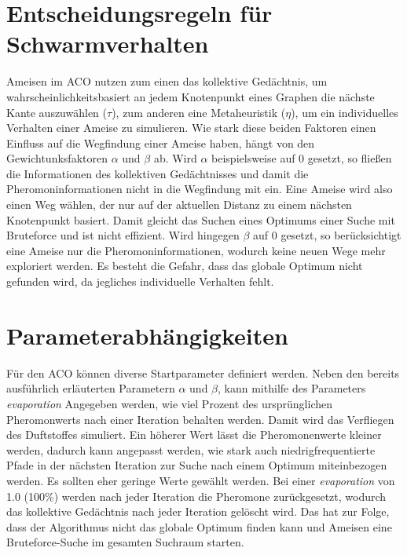 \section{Entscheidungsregeln für Schwarmverhalten}

Ameisen im ACO nutzen zum einen das kollektive Gedächtnis, um
wahrscheinlichkeitsbasiert an jedem Knotenpunkt eines Graphen die nächste
Kante auszuwählen ($\tau$), zum anderen eine Metaheuristik ($\eta$), um ein
individuelles Verhalten einer Ameise zu simulieren. Wie stark diese beiden
Faktoren einen Einfluss auf die Wegfindung einer Ameise haben, hängt von
den Gewichtunksfaktoren $\alpha$ und $\beta$ ab. Wird $\alpha$ beispielsweise
auf 0 gesetzt, so fließen die Informationen des kollektiven Gedächtnisses und
damit die Pheromoninformationen nicht in die Wegfindung mit ein. Eine Ameise
wird also einen Weg wählen, der nur auf der aktuellen Distanz zu einem nächsten
Knotenpunkt basiert. Damit gleicht das Suchen eines Optimums einer Suche mit
Bruteforce und ist nicht effizient. Wird hingegen $\beta$ auf 0 gesetzt, so
berücksichtigt eine Ameise nur die Pheromoninformationen, wodurch keine neuen
Wege mehr exploriert werden. Es besteht die Gefahr, dass das globale Optimum
nicht gefunden wird, da jegliches individuelle Verhalten fehlt.

\section{Parameterabhängigkeiten}

Für den ACO können diverse Startparameter definiert werden. Neben den
bereits ausführlich erläuterten Parametern $\alpha$ und $\beta$, kann
mithilfe des Parameters \emph{evaporation} Angegeben werden, wie viel Prozent
des ursprünglichen Pheromonwerts nach einer Iteration behalten werden. Damit
wird das Verfliegen des Duftstoffes simuliert. Ein höherer Wert lässt die
Pheromonenwerte kleiner werden, dadurch kann angepasst werden, wie stark
auch niedrigfrequentierte Pfade in der nächsten Iteration zur Suche nach einem
Optimum miteinbezogen werden. Es sollten eher geringe Werte gewählt werden.
Bei einer \emph{evaporation} von 1.0 (100\%) werden nach jeder Iteration die
Pheromone zurückgesetzt, wodurch das kollektive Gedächtnis nach jeder Iteration
gelöscht wird. Das hat zur Folge, dass der Algorithmus nicht das globale
Optimum finden kann und Ameisen eine Bruteforce-Suche im gesamten Suchraum
starten.

